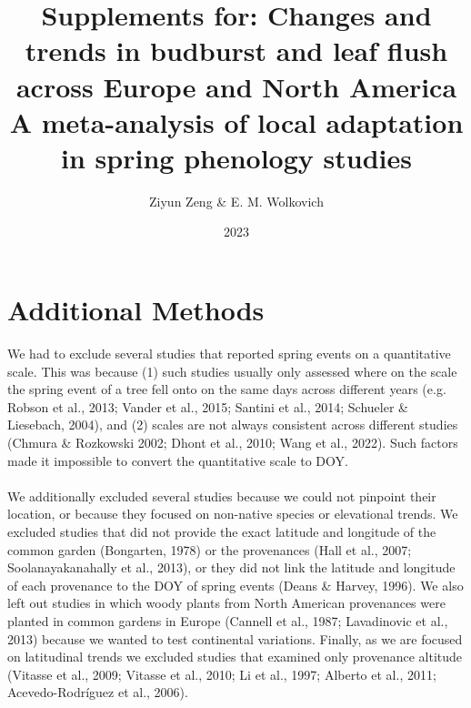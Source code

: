 \documentclass{article}
\begin{document}
\title{{\huge Supplements for: Changes and trends in budburst and leaf flush across Europe and North America} \\A meta-analysis of local adaptation in spring phenology studies}
\author{Ziyun Zeng \& E. M. Wolkovich}
\date{2023}
\maketitle 


\section{Additional Methods}
\label{section:addmethods}
We had to exclude several studies that reported spring events on a quantitative scale. This was because (1) such studies usually only assessed where on the scale the spring event of a tree fell onto on the same days across different years (e.g. Robson et al., 2013; Vander et al., 2015; Santini et al., 2014; Schueler \& Liesebach, 2004), and (2) scales are not always consistent across different studies (Chmura \& Rozkowski 2002; Dhont et al., 2010; Wang et al., 2022). Such factors made it impossible to convert the quantitative scale to DOY.
\\
\\
We additionally excluded several studies because we could not pinpoint their location, or because they focused on non-native species or elevational trends. We excluded studies that did not provide the exact latitude and longitude of the common garden (Bongarten, 1978) or the provenances (Hall et al., 2007; Soolanayakanahally et al., 2013), or they did not link the latitude and longitude of each provenance to the DOY of spring events (Deans \& Harvey, 1996). We also left out studies in which woody plants from North American provenances were planted in common gardens in Europe (Cannell et al., 1987; Lavadinovic et al., 2013) because we wanted to test continental variations. Finally, as we are focused on latitudinal trends we excluded studies that examined only provenance altitude (Vitasse et al., 2009; Vitasse et al., 2010; Li et al., 1997; Alberto et al., 2011; Acevedo-Rodríguez et al., 2006). 
\end{document}
